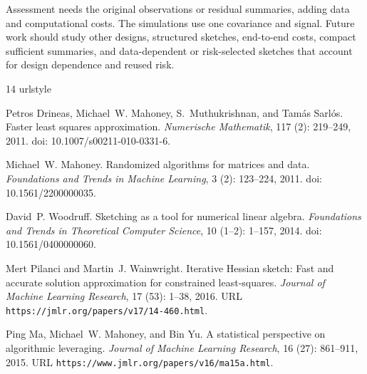 \documentclass{article}
\theoremstyle{plain}
\theoremstyle{definition}
\theoremstyle{definition}
\begin{document}
Assessment needs the original observations or residual summaries, adding
data and computational costs. The simulations use one covariance and
signal. Future work should study other designs, structured sketches,
end-to-end costs, compact sufficient summaries, and data-dependent or
risk-selected sketches that account for design dependence and reused risk.


\FloatBarrier

\clearpage

\begin{thebibliography}{14}
\providecommand{\natexlab}[1]{#1}
\providecommand{\url}[1]{\texttt{#1}}
\expandafter\ifx\csname urlstyle\endcsname\relax
  \providecommand{\doi}[1]{doi: #1}\else
  \providecommand{\doi}{doi: \begingroup \urlstyle{rm}\Url}\fi

Petros Drineas, Michael~W. Mahoney, S.~Muthukrishnan, and Tam{\'a}s Sarl{\'o}s.
\newblock Faster least squares approximation.
\newblock \emph{Numerische Mathematik}, 117 (2): 219--249, 2011.
\newblock \doi{10.1007/s00211-010-0331-6}.

Michael~W. Mahoney.
\newblock Randomized algorithms for matrices and data.
\newblock \emph{Foundations and Trends in Machine Learning}, 3 (2): 123--224, 2011.
\newblock \doi{10.1561/2200000035}.

David~P. Woodruff.
\newblock Sketching as a tool for numerical linear algebra.
\newblock \emph{Foundations and Trends in Theoretical Computer Science}, 10 (1--2): 1--157, 2014.
\newblock \doi{10.1561/0400000060}.

Mert Pilanci and Martin~J. Wainwright.
\newblock Iterative {Hessian} sketch: Fast and accurate solution approximation for constrained least-squares.
\newblock \emph{Journal of Machine Learning Research}, 17 (53): 1--38, 2016.
\newblock URL \url{https://jmlr.org/papers/v17/14-460.html}.

Ping Ma, Michael~W. Mahoney, and Bin Yu.
\newblock A statistical perspective on algorithmic leveraging.
\newblock \emph{Journal of Machine Learning Research}, 16 (27): 861--911, 2015.
\newblock URL \url{https://www.jmlr.org/papers/v16/ma15a.html}.


\end{thebibliography}
\end{document}
